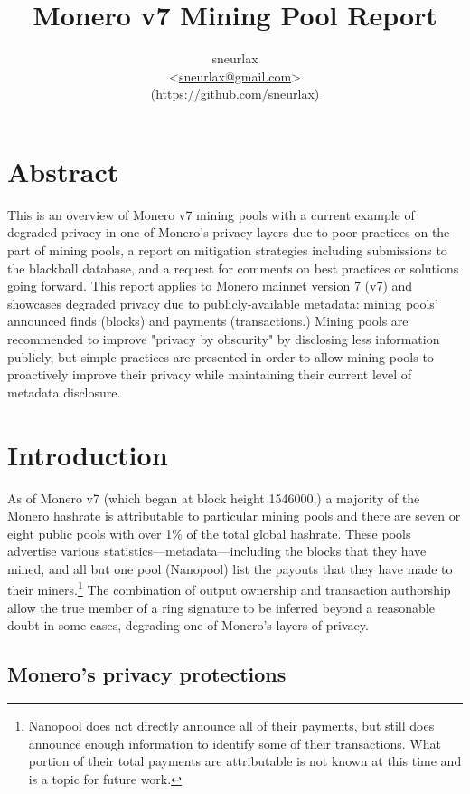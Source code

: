 \documentclass[notitlepage]{report}
\title{Monero v7 Mining Pool Report}
\author{sneurlax \\
\textless\url{sneurlax@gmail.com}\textgreater \\
(\url{https://github.com/sneurlax)}}
\begin{document}
\maketitle
\thispagestyle{empty}

\section*{Abstract}

This is an overview of Monero v7 mining pools with a current example of degraded privacy in one of Monero's privacy layers due to poor practices on the part of mining pools, a report on mitigation strategies including submissions to the blackball database, and a request for comments on best practices or solutions going forward.  This report applies to Monero mainnet version 7 (v7) and showcases degraded privacy due to publicly-available metadata: mining pools' announced finds (blocks) and payments (transactions.)  Mining pools are recommended to improve "privacy by obscurity" by disclosing less information publicly, but simple practices are presented in order to allow mining pools to proactively improve their privacy while maintaining their current level of metadata disclosure.

\clearpage

\tableofcontents

\section{Introduction}

\setcounter{page}{1}

As of Monero v7 (which began at block height 1546000,) a majority of the Monero hashrate is attributable to particular mining pools and there are seven or eight public pools with over 1\% of the total global hashrate.  These pools advertise various statistics---metadata---including the blocks that they have mined, and all but one pool (Nanopool) list the payouts that they have made to their miners.\footnote{Nanopool does not directly announce all of their payments, but still does announce enough information to identify some of their transactions.  What portion of their total payments are attributable is not known at this time and is a topic for future work.}  The combination of output ownership and transaction authorship allow the true member of a ring signature to be inferred beyond a reasonable doubt in some cases, degrading one of Monero's layers of privacy.

\subsection{Monero's privacy protections}
\end{document}
